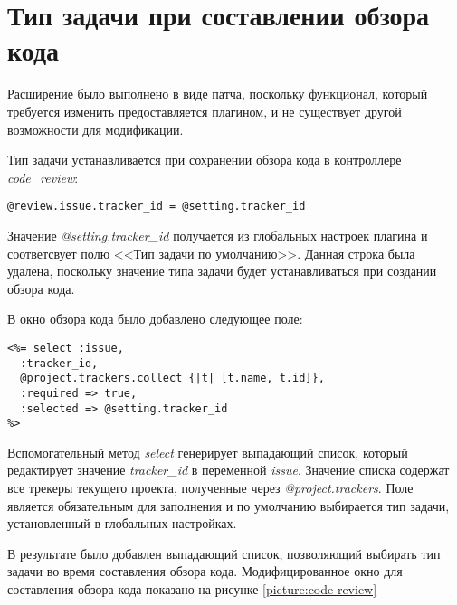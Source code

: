 \section{Тип задачи при составлении обзора кода}
Расширение было выполнено в виде патча, поскольку функционал, который требуется
изменить предоставляется плагином, и не существует другой возможности для
модификации.

Тип задачи устанавливается при сохранении обзора кода в контроллере
\textit{code\_review}:
\small{\begin{lstlisting}
@review.issue.tracker_id = @setting.tracker_id
\end{lstlisting}}
Значение \textit{@setting.tracker\_id} получается из глобальных настроек
плагина и соответсвует полю <<Тип задачи по умолчанию>>. Данная строка была
удалена, поскольку значение типа задачи будет устанавливаться при создании
обзора кода.

В окно обзора кода было добавлено следующее поле:
\small{\begin{lstlisting}
<%= select :issue,
  :tracker_id,
  @project.trackers.collect {|t| [t.name, t.id]},
  :required => true, 
  :selected => @setting.tracker_id 
%>
\end{lstlisting}}
Вспомогательный метод \textit{select} генерирует выпадающий список, который
редактирует значение \textit{tracker\_id} в переменной \textit{issue}. Значение
списка содержат все трекеры текущего проекта, полученные через
\textit{@project.trackers}. Поле является обязательным для заполнения и по
умолчанию выбирается тип задачи, установленный в глобальных настройках.

В результате было добавлен выпадающий список, позволяющий выбирать тип задачи
во время составления обзора кода. Модифицированное окно для составления обзора
кода показано на рисунке \ref{picture:code-review}


